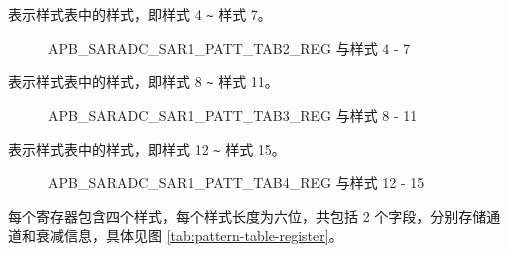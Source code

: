 \documentclass[main\_\_CN.tex]{subfiles}
\begin{document}
%
%
%
%
%
\begin{regdesc}\begin{reglist}
\item [cmd \regindex{n} (\regindex{n} = 4 - 7)] 表示样式表中的样式，即样式 4 \verb+~+ 样式 7。
\end{reglist}\end{regdesc}
\vspace{-2em}
\begin{figure}[H]
    \centering
    \caption{APB\_SARADC\_SAR1\_PATT\_TAB2\_REG 与样式 4 - 7}
    \label{fig:pattern-tab-2}
\end{figure}

%
%
%
%
%
\begin{regdesc}\begin{reglist}
\item [cmd \regindex{n} (\regindex{n} = 8 - 11)] 表示样式表中的样式，即样式 8 \verb+~+ 样式 11。
\end{reglist}\end{regdesc}
\vspace{-2em}
\begin{figure}[H]
    \centering
    \caption{APB\_SARADC\_SAR1\_PATT\_TAB3\_REG 与样式 8 - 11}
    \label{fig:pattern-tab-3}
\end{figure}

%
%
%
%
%
\begin{regdesc}\begin{reglist}
\item [cmd \regindex{n} (\regindex{n} = 12 - 15)] 表示样式表中的样式，即样式 12 \verb+~+ 样式 15。
\end{reglist}\end{regdesc}
\vspace{-2em}
\begin{figure}[H]
    \centering
    \caption{APB\_SARADC\_SAR1\_PATT\_TAB4\_REG 与样式 12 - 15}
    \label{fig:pattern-tab-4}
\end{figure}

每个寄存器包含四个样式，每个样式长度为六位，共包括 2 个字段，分别存储通道和衰减信息，具体见图 \ref{tab:pattern-table-register}。
\end{document}
